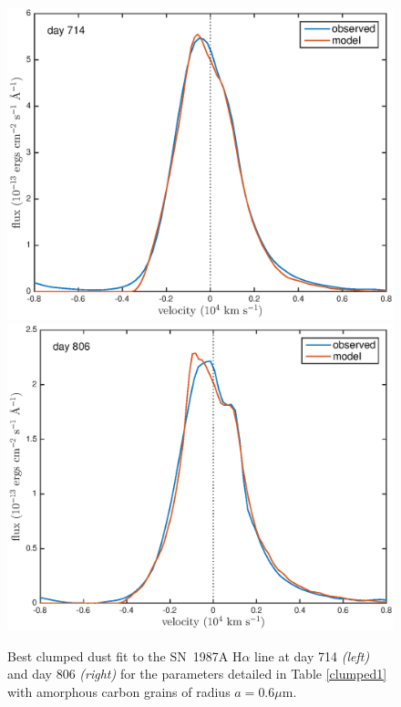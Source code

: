 \documentclass[useAMS,usenatbib,usegraphicx]{mnras}
\begin{document}
 \begin{figure}
\begin{center}
\includegraphics[trim =37 10 45 15,clip=true,scale=0.41]{clump_1/best_fit/d714Ha}
\includegraphics[trim =37 10 45 15,clip=true,scale=0.41]{clump_1/best_fit/d806Ha}
\caption{Best clumped dust fit to the SN~1987A H$\alpha$ line at day 714 \textit{\textit{(left)}} and day 806 \textit{\textit{(right)}} for the parameters detailed in Table \ref{clumped1} with amorphous carbon grains of radius $a=0.6 \mu$m.}
\label{Ha_clump1}
\end{center}
\end{figure}
\end{document}
